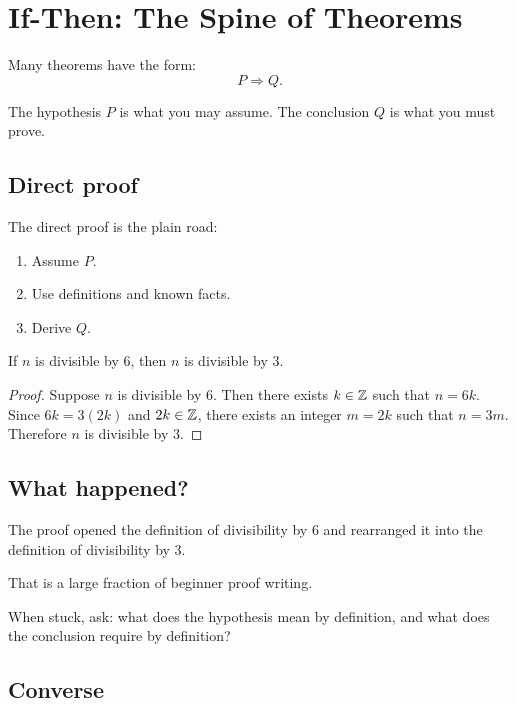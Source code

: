 \documentclass[11pt]{article}
\begin{document}
\newpage
\section{If-Then: The Spine of Theorems}

Many theorems have the form:
\[
P\Rightarrow Q.
\]

The hypothesis $P$ is what you may assume. The conclusion $Q$ is what you must prove.

\subsection{Direct proof}

The direct proof is the plain road:

\begin{enumerate}
\item Assume $P$.
\item Use definitions and known facts.
\item Derive $Q$.
\end{enumerate}

\begin{theorem}
If $n$ is divisible by $6$, then $n$ is divisible by $3$.
\end{theorem}

\begin{proof}
Suppose $n$ is divisible by $6$. Then there exists $k\in\mathbb{Z}$ such that $n=6k$. Since $6k=3(2k)$ and $2k\in\mathbb{Z}$, there exists an integer $m=2k$ such that $n=3m$. Therefore $n$ is divisible by $3$.
\end{proof}

\subsection{What happened?}

The proof opened the definition of divisibility by $6$ and rearranged it into the definition of divisibility by $3$.

That is a large fraction of beginner proof writing.

\begin{focusbox}
When stuck, ask: what does the hypothesis mean by definition, and what does the conclusion require by definition?
\end{focusbox}

\subsection{Converse}
\end{document}
